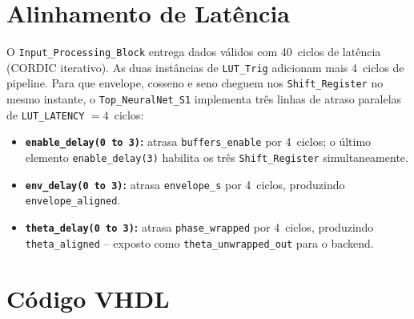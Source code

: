 \documentclass[a4paper,12pt]{article}
\begin{document}



\section{Alinhamento de Lat\^encia}
\label{sec:latency}

O \texttt{Input\_Processing\_Block} entrega dados v\'alidos com 40~ciclos de lat\^encia
(CORDIC iterativo). As duas inst\^ancias de \texttt{LUT\_Trig} adicionam mais 4~ciclos
de pipeline. Para que envelope, cosseno e seno cheguem nos \texttt{Shift\_Register} no
mesmo instante, o \texttt{Top\_NeuralNet\_S1} implementa tr\^es linhas de atraso
paralelas de \texttt{LUT\_LATENCY} $= 4$~ciclos:

\begin{itemize}
    \item \textbf{\texttt{enable\_delay(0 to 3)}:} atrasa \texttt{buffers\_enable} por
          4~ciclos; o \'ultimo elemento \texttt{enable\_delay(3)} habilita os tr\^es
          \texttt{Shift\_Register} simultaneamente.

    \item \textbf{\texttt{env\_delay(0 to 3)}:} atrasa \texttt{envelope\_s} por 4~ciclos,
          produzindo \texttt{envelope\_aligned}.

    \item \textbf{\texttt{theta\_delay(0 to 3)}:} atrasa \texttt{phase\_wrapped} por
          4~ciclos, produzindo \texttt{theta\_aligned} -- exposto como
          \texttt{theta\_unwrapped\_out} para o backend.
\end{itemize}


\section{C\'odigo VHDL}
\end{document}
